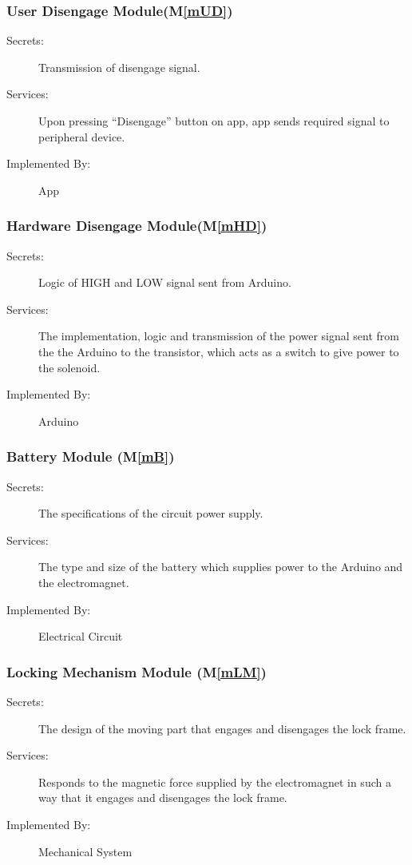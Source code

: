 \documentclass[12pt, titlepage]{article}
\newcommand{\mref}[1]{M\ref{#1}}
\begin{document}
\subsubsection{User Disengage Module(\mref{mUD})}
\begin{description}
\item[Secrets:] Transmission of disengage signal.
\item[Services:]Upon pressing “Disengage” button on app, app sends required signal to peripheral device.
\item[Implemented By:]App
\end{description}

\subsubsection{Hardware Disengage Module(\mref{mHD})}
\begin{description}
\item[Secrets:] Logic of HIGH and LOW signal sent from Arduino.
\item[Services:]The implementation, logic and transmission of the power signal sent from the 
the Arduino to the transistor, which acts as a switch to give power to the solenoid. 
\item[Implemented By:]Arduino
\end{description}

\subsubsection{Battery Module (\mref{mB})}
\begin{description}
\item[Secrets:]The specifications of the circuit power supply.
\item[Services:]The type and size of the battery which supplies power to the Arduino and the electromagnet. 
\item[Implemented By:]Electrical Circuit
\end{description}


\subsubsection{Locking Mechanism Module (\mref{mLM})}
\begin{description}
\item[Secrets:]The design of the moving part that engages and disengages the lock frame.
\item[Services:]Responds to the magnetic force supplied by the electromagnet in such a way that it engages and disengages the lock frame.
\item[Implemented By:]Mechanical System
\end{description}
\end{document}
